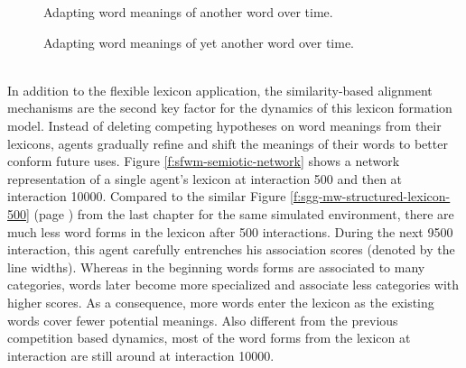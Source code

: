 \begin{figure}[t]
  \caption{Adapting word meanings of another word over time.}
  \label{f:sfwm-attribute-scores-2}
\end{figure}

\begin{figure}[t]
  \caption{Adapting word meanings of yet another word over time.}
  \label{f:sfwm-attribute-scores-3}
\end{figure}

\stopfiguregroup


~\\

\noindent In addition to the flexible lexicon application, the
similarity-based alignment mechanisms are the second key factor for
the dynamics of this lexicon formation model. Instead of deleting
competing hypotheses on word meanings from their lexicons, agents
gradually refine and shift the meanings of their words to better
conform future uses.  Figure \ref{f:sfwm-semiotic-network} shows a
network representation of a single agent's lexicon at interaction 500
and then at interaction 10000. Compared to the similar Figure
\ref{f:sgg-mw-structured-lexicon-500} (page
\pageref{f:sgg-mw-structured-lexicon-500}) from the last chapter for
the same simulated environment, there are much less word forms in the
lexicon after 500 interactions. During the next 9500 interaction, this
agent carefully entrenches his association scores (denoted by the line
widths). Whereas in the beginning words forms are associated to many
categories, words later become more specialized and associate less
categories with higher scores. As a consequence, more words enter the
lexicon as the existing words cover fewer potential meanings. Also
different from the previous competition based dynamics, most of the
word forms from the lexicon at interaction are still around at
interaction 10000.


